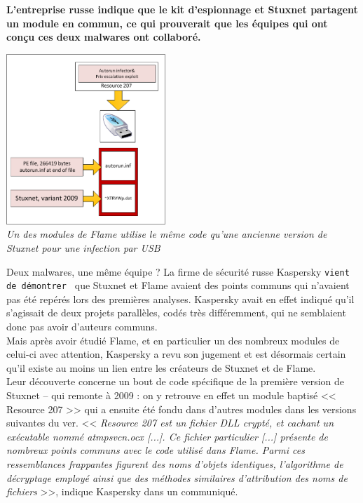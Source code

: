 \documentclass[11pt,twoside,a4paper]{article}
\begin{document}
\textbf{L'entreprise russe indique que le kit d'espionnage et Stuxnet partagent un module en commun, ce qui prouverait que les {\'e}quipes qui ont con\c{c}u ces deux malwares ont collabor{\'e}.}~\\

\begin{minipage}[ht]{6.25cm}	
	\includegraphics[width=6.00cm]{img/686461.png}
	~\\ \emph{\small Un des modules de Flame utilise le m{\^e}me code qu'une ancienne version de Stuxnet pour une infection par USB}
\end{minipage} \hfill \begin{minipage}[ht]{12.50cm}
	\small
	Deux malwares, une m{\^e}me {\'e}quipe ? La firme de s{\'e}curit{\'e} russe Kaspersky \texttt{vient de d{\'e}montrer~\footnotemark} que Stuxnet et Flame avaient des points communs qui n'avaient pas {\'e}t{\'e} rep{\'e}r{\'e}s lors des premi{\`e}res analyses. Kaspersky avait en effet indiqu{\'e} qu'il s'agissait de deux projets parall{\`e}les, cod{\'e}s tr{\`e}s diff{\'e}remment, qui ne semblaient donc pas avoir d'auteurs communs.~\\
	
	Mais apr{\`e}s avoir {\'e}tudi{\'e} Flame, et en particulier un des nombreux modules de celui-ci avec attention, Kaspersky a revu son jugement et est d{\'e}sormais certain qu'il existe au moins un lien entre les cr{\'e}ateurs de Stuxnet et de Flame.~\\  

	Leur d{\'e}couverte concerne un bout de code sp{\'e}cifique de la premi{\`e}re version de Stuxnet -- qui remonte {\`a} 2009 : on y retrouve en effet un module baptis{\'e} << Resource 207 >> qui a ensuite {\'e}t{\'e} fondu dans d'autres modules dans les versions suivantes du ver. << \emph{Resource 207 est un fichier DLL crypt{\'e}, et cachant un ex{\'e}cutable nomm{\'e} atmpsvcn.ocx [...]. Ce fichier particulier [...] pr{\'e}sente de nombreux points communs avec le code utilis{\'e} dans Flame. Parmi ces ressemblances frappantes figurent des noms d'objets identiques, l'algorithme de d{\'e}cryptage employ{\'e} ainsi que des m{\'e}thodes similaires d'attribution des noms de fichiers } >>, indique Kaspersky dans un communiqu{\'e}.~\\
\end{minipage}~\\
~
\end{document}

